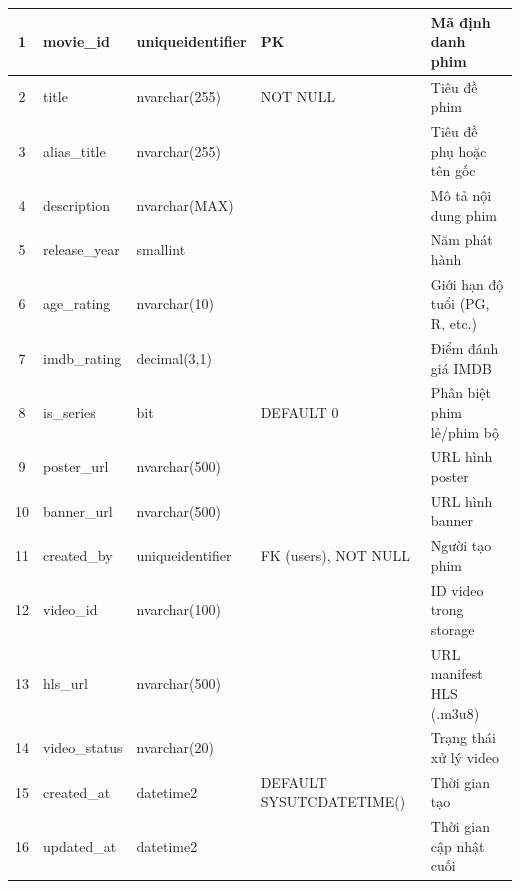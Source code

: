 \begin{center}
\begin{longtable}{|c|p{3cm}|p{2.5cm}|p{3cm}|p{4cm}|}
		1            & movie\_id           & uniqueidentifier      & PK                       & Mã định danh phim              \\
		\hline
		2            & title               & nvarchar(255)         & NOT NULL                 & Tiêu đề phim                   \\
		\hline
		3            & alias\_title        & nvarchar(255)         &                          & Tiêu đề phụ hoặc tên gốc       \\
		\hline
		4            & description         & nvarchar(MAX)         &                          & Mô tả nội dung phim            \\
		\hline
		5            & release\_year       & smallint              &                          & Năm phát hành                  \\
		\hline
		6            & age\_rating         & nvarchar(10)          &                          & Giới hạn độ tuổi (PG, R, etc.) \\
		\hline
		7            & imdb\_rating        & decimal(3,1)          &                          & Điểm đánh giá IMDB             \\
		\hline
		8            & is\_series          & bit                   & DEFAULT 0                & Phân biệt phim lẻ/phim bộ      \\
		\hline
		9            & poster\_url         & nvarchar(500)         &                          & URL hình poster                \\
		\hline
		10           & banner\_url         & nvarchar(500)         &                          & URL hình banner                \\
		\hline
		11           & created\_by         & uniqueidentifier      & FK (users), NOT NULL     & Người tạo phim                 \\
		\hline
		12           & video\_id           & nvarchar(100)         &                          & ID video trong storage         \\
		\hline
		13           & hls\_url            & nvarchar(500)         &                          & URL manifest HLS (.m3u8)       \\
		\hline
		14           & video\_status       & nvarchar(20)          &                          & Trạng thái xử lý video         \\
		\hline
		15           & created\_at         & datetime2             & DEFAULT SYSUTCDATETIME() & Thời gian tạo                  \\
		\hline
		16           & updated\_at         & datetime2             &                          & Thời gian cập nhật cuối        \\
		\hline
	\end{longtable}
\end{center}

